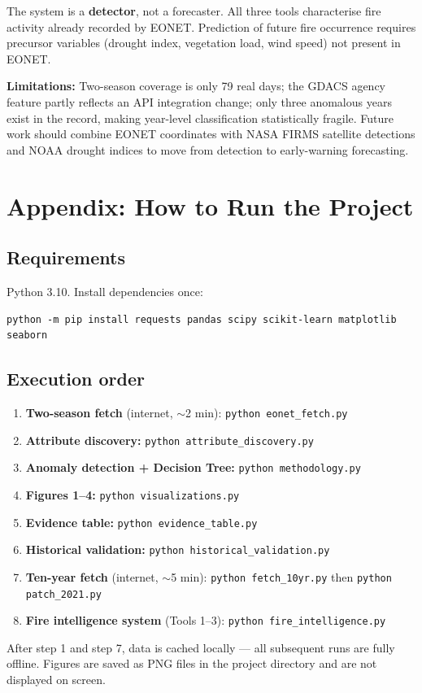 \documentclass[12pt, letterpaper]{article}
\begin{document}
The system is a \textbf{detector}, not a forecaster. All three tools
characterise fire activity already recorded by EONET. Prediction of future
fire occurrence requires precursor variables (drought index, vegetation load,
wind speed) not present in EONET.

\textbf{Limitations:} Two-season coverage is only 79 real days; the GDACS
agency feature partly reflects an API integration change; only three anomalous
years exist in the record, making year-level classification statistically
fragile. Future work should combine EONET coordinates with NASA FIRMS satellite
detections and NOAA drought indices to move from detection to early-warning
forecasting.

\section*{Appendix: How to Run the Project}

\subsection*{Requirements}

Python 3.10. Install dependencies once:
\begin{verbatim}
python -m pip install requests pandas scipy scikit-learn matplotlib seaborn
\end{verbatim}

\subsection*{Execution order}

\begin{enumerate}
  \item \textbf{Two-season fetch} (internet, $\sim$2 min):
        \texttt{python eonet\_fetch.py}
  \item \textbf{Attribute discovery:}
        \texttt{python attribute\_discovery.py}
  \item \textbf{Anomaly detection + Decision Tree:}
        \texttt{python methodology.py}
  \item \textbf{Figures 1--4:}
        \texttt{python visualizations.py}
  \item \textbf{Evidence table:}
        \texttt{python evidence\_table.py}
  \item \textbf{Historical validation:}
        \texttt{python historical\_validation.py}
  \item \textbf{Ten-year fetch} (internet, $\sim$5 min):
        \texttt{python fetch\_10yr.py} then
        \texttt{python patch\_2021.py}
  \item \textbf{Fire intelligence system} (Tools 1--3):
        \texttt{python fire\_intelligence.py}
\end{enumerate}

\noindent After step 1 and step 7, data is cached locally --- all subsequent
runs are fully offline. Figures are saved as PNG files in the project
directory and are not displayed on screen.
\end{document}
